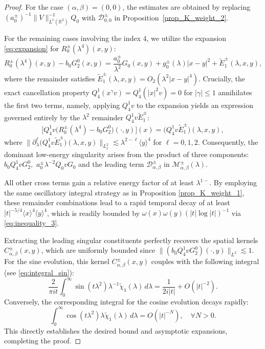 \documentclass[reqno]{amsart}
\numberwithin{equation}{section}
\begin{document}
\begin{proof}      
	For the case $(\alpha,\beta)=(0,0)$, the estimates are obtained by replacing 
    $(a_0^\pm)^{-1} \|V\|_{L^1(\mathbb{R}^2)}^{-1}Q_0$ with
    $\mathcal{D}_{0,0}^{\pm}$ in 
   Proposition~\ref{prop_K_weight_2}.   

	For the remaining cases involving the index $4$, we utilize the expansion \eqref{eq:expansion} for $R_0^\pm(\lambda^4)(x,y) $:    
	\[    
	R_0^\pm(\lambda^4)(x,y) - b_0G_2^0(x,y) = \frac{a_0^\pm}{\lambda^2}G_0(x,y) + g_0^\pm(\lambda)|x-y|^2 + \widetilde{E}_1^{\pm}(\lambda,x,y),   
	\]    
	where the remainder satisfies $\widetilde{E}_1^{\pm}(\lambda,x,y) = O_2(\lambda^{2}|x-y|^{4})$.     
	Crucially, the exact cancellation property $Q_{4}^1(x^\gamma v)=Q_{4}^1(|x|^2 v)= 0$ for $|\gamma| \le 1$ annihilates the first two terms, namely, applying $Q_{4}^1 v$ to the expansion yields an expression governed entirely by the $\lambda^2$ remainder $Q_{4}^1 v \widetilde{E}_1^\pm$: 
	\[    
	\bigl[Q_{4}^1 v \bigl(R_0^\pm(\lambda^4) - b_0 G_2^0\bigr)(\cdot, y)\bigr](x) = \bigl(Q_{4}^1 v \widetilde{E}_1^\pm\bigr)(\lambda,x,y),  
	\]    
    where $\|\partial_\lambda^\ell\bigl(Q_{4}^1 v \widetilde{E}_1^\pm\bigr)(\lambda,x,y)\|_{L_x^2}\lesssim \lambda^{2-\ell}\langle y\rangle^4$ for $\ell=0,1,2.$	Consequently, the dominant low-energy singularity arises from the product of three components: $b_0Q_{4}^1vG_2^0,$ $a_0^\pm\lambda^{-2}Q_0vG_0$ and the leading term $\mathcal{D}_{\alpha,\beta}^{\pm}$ in $\mathcal{M}_{\alpha,\beta}^{\pm}(\lambda).$  
	
	All other cross terms gain a relative energy factor of at least $\lambda^{1-}$. 
	By employing the same oscillatory integral strategy as in Proposition \ref{prop_K_weight_1}, these  remainder combinations lead to a rapid temporal decay of at least $|t|^{-5/4}\langle x\rangle^4\langle y\rangle^4$, which is readily bounded by $\omega(x)\omega(y)(|t|\log|t|)^{-1}$ via \eqref{eq:inequality_3}.    
	
	Extracting the leading singular constituents perfectly recovers the spatial kernels $C^\pm_{\alpha,\beta}(x,y)$, which are uniformly bounded since $\|(b_0 Q_{4}^1 v G_2^0)(\cdot,y)\|_{L^2} \lesssim 1$. For the sine evolution, this  kernel $C^\pm_{\alpha,\beta}(x,y)$ couples with the following integral (see \eqref{eq:integral_sin}):    
	\[
	\frac{2}{\pi i t}\int_0^\infty \sin(t\lambda^2)\lambda^{-1}\widetilde{\chi}_1(\lambda)\,d\lambda = \frac{1}{2 i |t|}  +{O}(|t|^{-2}).
	\]   
	Conversely, the corresponding integral for the cosine evolution  decays rapidly:    
	\[    
	\int_0^\infty \cos(t\lambda^2)\lambda\widetilde{\chi}_1(\lambda)\,d\lambda = O(|t|^{-N}), \quad \forall N>0.    
	\]    
	This directly establishes the desired  bound and asymptotic expansions, completing the proof.    
\end{proof}  
\end{document}
